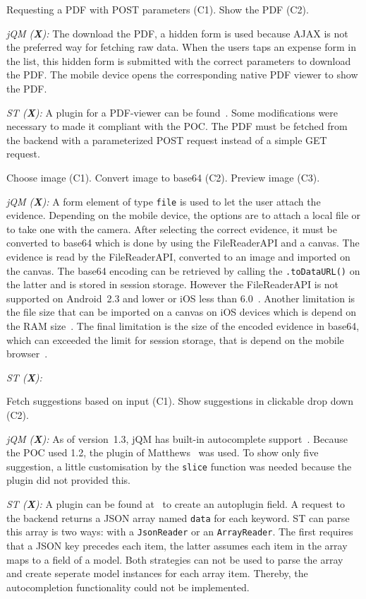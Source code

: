 \documentclass[a4paper]{artikel3}
\newcommand{\code}[1]{\texttt{#1}}
\renewcommand{\paragraph}[1]{\vspace{2mm} \noindent {\bf #1}  }
\newcommand{\framework}[2]{ \emph{#1 (\textbf{#2}): }} %
\newcommand{\challenge}[1]{\paragraph{#1}}
\begin{document}
\challenge{Show PDF (C1,C2)}
Requesting a PDF with POST parameters (C1).
Show the PDF (C2).

\framework{jQM}{X}
The download the PDF, a hidden form is used because AJAX is not the preferred way for fetching raw data.
When the users taps an expense form in the list, this hidden form is submitted with the correct parameters to download the PDF.
The mobile device opens the corresponding native PDF viewer to show the PDF.

\framework{ST}{X}
A plugin for a PDF-viewer can be found~\cite{Fiedler2012}.  Some modifications were necessary to made it compliant with the POC.  The PDF must be fetched from the backend with a parameterized POST request instead of a simple GET request.  

\challenge{Attach image (C1,C2,C3)}
Choose image (C1).
Convert image to base64 (C2).
Preview image (C3).

\framework{jQM}{X}
A form element of type \code{file} is used to let the user attach the evidence.
Depending on the mobile device, the options are to attach a local file or to take one with the camera.
After selecting the correct evidence, it must be converted to base64 which is done by using the FileReaderAPI and a canvas.
The evidence is read by the FileReaderAPI, converted to an image and imported on the canvas.
The base64 encoding can be retrieved by calling the \code{.toDataURL()} on the latter and is stored in session storage.
However the FileReaderAPI is not supported on Android~2.3 and lower or iOS less than 6.0~\cite{Deveria2013a}.
Another limitation is the file size that can be imported on a canvas on iOS devices which is depend on the RAM size~\cite{Apple2012}.
The final limitation is the size of the encoded evidence in base64, which can exceeded the limit for session storage, that is depend on the mobile browser~\cite{Gonzalez2012}.

\framework{ST}{X}

\challenge{Autocomplete (C1,C2)}
Fetch suggestions based on input (C1).
Show suggestions in clickable drop down (C2).

\framework{jQM}{X}
As of version~1.3, jQM has built-in autocomplete support~\cite{JQuery2013c}.
Because the POC used 1.2, the plugin of Matthews~\cite{Matthews2013} was used.
To show only five suggestion, a little customisation by the \code{slice} function was needed because the plugin did not provided this.

\framework{ST}{X}
A plugin can be found at~\cite{Mysamplecode2012} to create an autoplugin field.  A request to the backend returns a JSON array named \code{data} for each keyword.  ST can parse this array is two ways:  with a \code{JsonReader} or an \code{ArrayReader}.  The first requires that a JSON key precedes each item,  the latter assumes each item in the array maps to a field of a model.  Both strategies can not be used to parse the array and create seperate model instances for each array item.  Thereby,  the autocompletion functionality could not be implemented.
\end{document}
